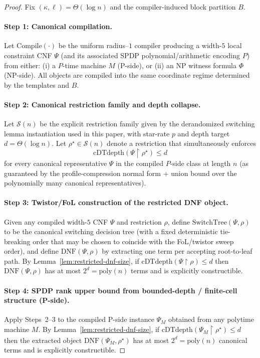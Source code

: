 \documentclass[12pt]{article}
\theoremstyle{definition}
\theoremstyle{definition}
\theoremstyle{remark}
\theoremstyle{remark}
\begin{document}
\begin{proof}
Fix $(\kappa,\ell)=\Theta(\log n)$ and the compiler-induced block partition $B$.

\paragraph{Step 1: Canonical compilation.}
Let $\mathrm{Compile}(\cdot)$ be the uniform radius--$1$ compiler producing a width-$5$ local
constraint CNF $\Psi$ (and its associated SPDP polynomial/arithmetic encoding $P$) from either:
(i) a $P$-time machine $M$ (P-side), or (ii) an NP witness formula $\Phi$ (NP-side).
All objects are compiled into the same coordinate regime determined by the templates and $B$.

\paragraph{Step 2: Canonical restriction family and depth collapse.}
Let $\mathcal{S}(n)$ be the explicit restriction family given by the derandomized switching lemma
instantiation used in this paper, with star-rate $p$ and depth target $d=\Theta(\log n)$.
Let $\rho^\star\in\mathcal{S}(n)$ denote a restriction that simultaneously enforces
\[
\mathrm{cDTdepth}(\Psi\upharpoonright \rho^\star)\le d
\]
for every canonical representative $\Psi$ in the compiled $P$-side class at length $n$
(as guaranteed by the profile-compression normal form + union bound over the polynomially many
canonical representatives).

\paragraph{Step 3: Twistor/FoL construction of the restricted DNF object.}
Given any compiled width-$5$ CNF $\Psi$ and restriction $\rho$, define $\mathrm{SwitchTree}(\Psi,\rho)$
to be the canonical switching decision tree (with a fixed deterministic tie-breaking order that may be
chosen to coincide with the FoL/twistor sweep order), and define $\mathrm{DNF}(\Psi,\rho)$ by
extracting one term per accepting root-to-leaf path.
By Lemma~\ref{lem:restricted-dnf-size}, if $\mathrm{cDTdepth}(\Psi\upharpoonright\rho)\le d$ then
$\mathrm{DNF}(\Psi,\rho)$ has at most $2^d=\mathrm{poly}(n)$ terms and is explicitly constructible.


\paragraph{Step 4: SPDP rank upper bound from bounded-depth / finite-cell structure (P-side).}
Apply Steps~2--3 to the compiled P-side instance $\Psi_M$ obtained from any polytime
machine $M$.  By Lemma~\ref{lem:restricted-dnf-size},
if $\mathrm{cDTdepth}(\Psi_M\!\upharpoonright \rho^\star)\le d$ then the extracted object
$\mathrm{DNF}(\Psi_M,\rho^\star)$ has at most $2^d=\mathrm{poly}(n)$ canonical terms and is
explicitly constructible.


\end{proof}
\end{document}
